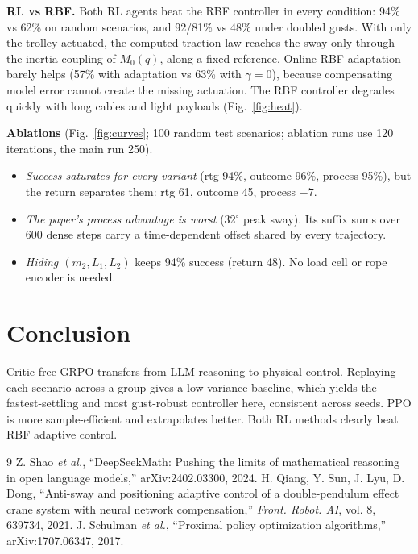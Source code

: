 \documentclass[10pt,conference]{IEEEtran}
\begin{document}
\textbf{RL vs RBF.} Both RL agents beat the RBF controller in every condition: 94\% vs 62\% on random scenarios, and 92/81\% vs 48\% under doubled gusts. With only the trolley actuated, the computed-traction law reaches the sway only through the inertia coupling of $M_0(q)$, along a fixed reference. Online RBF adaptation barely helps (57\% with adaptation vs 63\% with $\gamma{=}0$), because compensating model error cannot create the missing actuation. The RBF controller degrades quickly with long cables and light payloads (Fig.~\ref{fig:heat}).

\textbf{Ablations} (Fig.~\ref{fig:curves}; 100 random test scenarios; ablation runs use 120 iterations, the main run 250).

\begin{itemize}
\item \emph{Success saturates for every variant} (rtg 94\%, outcome 96\%, process 95\%), but the return separates them: rtg 61, outcome 45, process $-7$.
\item \emph{The paper's process advantage is worst} (32$^\circ$ peak sway). Its suffix sums over 600 dense steps carry a time-dependent offset shared by every trajectory.
\item \emph{Hiding $(m_2,L_1,L_2)$} keeps 94\% success (return 48). No load cell or rope encoder is needed.
\end{itemize}

\section{Conclusion}
Critic-free GRPO transfers from LLM reasoning to physical control. Replaying each scenario across a group gives a low-variance baseline, which yields the fastest-settling and most gust-robust controller here, consistent across seeds. PPO is more sample-efficient and extrapolates better. Both RL methods clearly beat RBF adaptive control.



\begin{thebibliography}{9}
 Z. Shao \emph{et al.}, ``DeepSeekMath: Pushing the limits of mathematical reasoning in open language models,'' arXiv:2402.03300, 2024.
 H. Qiang, Y. Sun, J. Lyu, D. Dong, ``Anti-sway and positioning adaptive control of a double-pendulum effect crane system with neural network compensation,'' \emph{Front. Robot. AI}, vol. 8, 639734, 2021.
 J. Schulman \emph{et al.}, ``Proximal policy optimization algorithms,'' arXiv:1707.06347, 2017.
\end{thebibliography}
\end{document}
